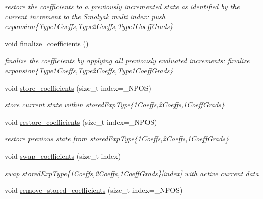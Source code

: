\begin{DoxyCompactItemize}
\begin{DoxyCompactList}\small\item\em restore the coefficients to a previously incremented state as identified by the current increment to the Smolyak multi index\+: push expansion\{Type1\+Coeffs,Type2\+Coeffs,Type1\+Coeff\+Grads\} \end{DoxyCompactList}\item 
void \hyperlink{classPecos_1_1NodalInterpPolyApproximation_a742e0217d6f681e08f401409771f4f4a}{finalize\+\_\+coefficients} ()\label{classPecos_1_1NodalInterpPolyApproximation_a742e0217d6f681e08f401409771f4f4a}

\begin{DoxyCompactList}\small\item\em finalize the coefficients by applying all previously evaluated increments\+: finalize expansion\{Type1\+Coeffs,Type2\+Coeffs,Type1\+Coeff\+Grads\} \end{DoxyCompactList}\item 
void \hyperlink{classPecos_1_1NodalInterpPolyApproximation_abc17a7104c33d8146f4a0ee7b6c6f37a}{store\+\_\+coefficients} (size\+\_\+t index=\+\_\+\+N\+P\+OS)\label{classPecos_1_1NodalInterpPolyApproximation_abc17a7104c33d8146f4a0ee7b6c6f37a}

\begin{DoxyCompactList}\small\item\em store current state within stored\+Exp\+Type\{1\+Coeffs,2\+Coeffs,1\+Coeff\+Grads\} \end{DoxyCompactList}\item 
void \hyperlink{classPecos_1_1NodalInterpPolyApproximation_ad05b093ee96314c9e05bad8e06c2dae7}{restore\+\_\+coefficients} (size\+\_\+t index=\+\_\+\+N\+P\+OS)\label{classPecos_1_1NodalInterpPolyApproximation_ad05b093ee96314c9e05bad8e06c2dae7}

\begin{DoxyCompactList}\small\item\em restore previous state from stored\+Exp\+Type\{1\+Coeffs,2\+Coeffs,1\+Coeff\+Grads\} \end{DoxyCompactList}\item 
void \hyperlink{classPecos_1_1NodalInterpPolyApproximation_af5c6af74d2c8c5575fefb46ce55af90d}{swap\+\_\+coefficients} (size\+\_\+t index)\label{classPecos_1_1NodalInterpPolyApproximation_af5c6af74d2c8c5575fefb46ce55af90d}

\begin{DoxyCompactList}\small\item\em swap stored\+Exp\+Type\{1\+Coeffs,2\+Coeffs,1\+Coeff\+Grads\}\mbox{[}index\mbox{]} with active current data \end{DoxyCompactList}\item 
void \hyperlink{classPecos_1_1NodalInterpPolyApproximation_a63d12cc6021fda4896b8738d72dfcc86}{remove\+\_\+stored\+\_\+coefficients} (size\+\_\+t index=\+\_\+\+N\+P\+OS)\label{classPecos_1_1NodalInterpPolyApproximation_a63d12cc6021fda4896b8738d72dfcc86}


\end{DoxyCompactItemize}

